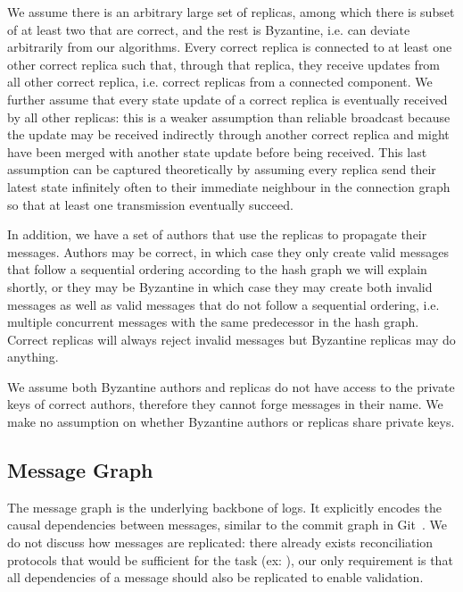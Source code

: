 \documentclass[9pt, oneside]{article}   	%
\begin{document}
We assume there is an arbitrary large set of replicas, among which there is subset of at least two that are correct, and the rest is Byzantine, i.e. can deviate arbitrarily from our algorithms. Every correct replica is connected to at least one other correct replica such that, through that replica, they receive updates from all other correct replica, i.e. correct replicas from a connected component. We further assume that every state update of a correct replica is eventually received by all other replicas: this is a weaker assumption than reliable broadcast because the update may be received indirectly through another correct replica and might have been merged with another state update before being received. This last assumption can be captured theoretically by assuming every replica send their latest state infinitely often to their immediate neighbour in the connection graph so that at least one transmission eventually succeed.

In addition, we have a set of authors that use the replicas to propagate their messages. Authors may be correct, in which case they only create valid messages that follow a sequential ordering according to the hash graph we will explain shortly, or they may be Byzantine in which case they may create both invalid messages as well as valid messages that do not follow a sequential ordering, i.e. multiple concurrent messages with the same predecessor in the hash graph. Correct replicas will always reject invalid messages but Byzantine replicas may do anything.

We assume both Byzantine authors and replicas do not have access to the private keys of correct authors, therefore they cannot forge messages in their name. We make no assumption on whether Byzantine authors or replicas share private keys.

\subsection{Message Graph}
\label{sec:design:message}

The message graph is the underlying backbone of logs. It explicitly encodes the causal dependencies between messages, similar to the commit graph in Git~\cite{git-commit}.  We do not discuss how messages are replicated: there already exists reconciliation protocols that would be sufficient for the task (ex: \cite{kleppmann2020bec}), our only requirement is that all dependencies of a message should also be replicated to enable validation.
\end{document}
